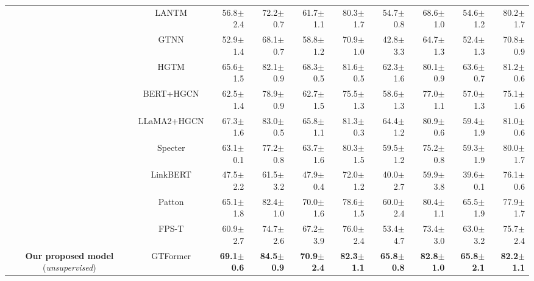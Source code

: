 \begin{table*}[!h]
{\begin{tabular}{c|c|rrrr|rrrr}
			{} & LANTM & 56.8$ \pm $2.4 & 72.2$ \pm $0.7 & 61.7$ \pm $1.1 & 80.3$ \pm $1.7 & 54.7$ \pm $0.8 & 68.6$ \pm $1.0 & 54.6$ \pm $1.2 & 80.2$ \pm $1.7 \\
			{} & GTNN & 52.9$ \pm $1.4 & 68.1$ \pm $0.7 & 58.8$ \pm $1.2 & 70.9$ \pm $1.0 & 42.8$ \pm $3.3 & 64.7$ \pm $1.3 & 52.4$ \pm $1.3 & 70.8$ \pm $0.9 \\
            {} & HGTM & 65.6$ \pm $1.5 & 82.1$ \pm $0.9 & 68.3$ \pm $0.5 & 81.6$ \pm $0.5 & 62.3$ \pm $1.6 & 80.1$ \pm $0.9 & 63.6$ \pm $0.7 & 81.2$ \pm $0.6 \\
            \hline
			\multirow{5}{*}{\shortstack{\textbf{Text-attributed graph models}}} & BERT+HGCN & 62.5$ \pm $1.4 & 78.9$ \pm $0.9 & 62.7$ \pm $1.5 & 75.5$ \pm $1.3 & 58.6$ \pm $1.3 & 77.0$ \pm $1.1 & 57.0$ \pm $1.3 & 75.1$ \pm $1.6 \\
            {} & LLaMA2+HGCN & 67.3$ \pm $1.6 & 83.0$ \pm $0.5 & 65.8$ \pm $1.1 & 81.3$ \pm $0.3 & 64.4$ \pm $1.2 & 80.9$ \pm $0.6 & 59.4$ \pm $1.9 & 81.0$ \pm $0.6 \\
            {} & Specter & 63.1$ \pm $0.1 & 77.2$ \pm $0.8 & 63.7$ \pm $1.6 & 80.3$ \pm $1.5 & 59.5$ \pm $1.2 & 75.2$ \pm $0.8 & 59.3$ \pm $1.9 & 80.0$ \pm $1.7 \\
            {} & LinkBERT & 47.5$ \pm $2.2 & 61.5$ \pm $3.2 & 47.9$ \pm $0.4 & 72.0$ \pm $1.2 & 40.0$ \pm $2.7 & 59.9$ \pm $3.8 & 39.6$ \pm $0.1 & 76.1$ \pm $0.6 \\
            {} & Patton & 65.1$ \pm $1.8 & 82.4$ \pm $1.0 & 70.0$ \pm $1.6 & 78.6$ \pm $1.5 & 60.0$ \pm $2.4 & 80.4$ \pm $1.1 & 65.5$ \pm $1.9 & 77.9$ \pm $1.7 \\
			\hline
			\multirow{1}{*}{\shortstack{\textbf{Hyperbolic graph transformer}}} & FPS-T & 60.9$ \pm $2.7 & 74.7$ \pm $2.6 & 67.2$ \pm $3.9 & 76.0$ \pm $2.4 & 53.4$ \pm $4.7 & 73.4$ \pm $3.0 & 63.0$ \pm $3.2 & 75.7$ \pm $2.4 \\
			\hline
			{\textbf{Our proposed model} (\emph{unsupervised})} & GTFormer & \textbf{69.1}$ \pm $\textbf{0.6} & \textbf{84.5}$ \pm $\textbf{0.9} & \textbf{70.9}$ \pm $\textbf{2.4} & \textbf{82.3}$ \pm $\textbf{1.1} & \textbf{65.8}$ \pm $\textbf{0.8} & \textbf{82.8}$ \pm $\textbf{1.0} & \textbf{65.8}$ \pm $\textbf{2.1} & \textbf{82.2}$ \pm $\textbf{1.1} \\
			\bottomrule
		\end{tabular}
	}
	\vspace{-0.2cm}
	\label{table:unsupervised_classification}
\end{table*}
